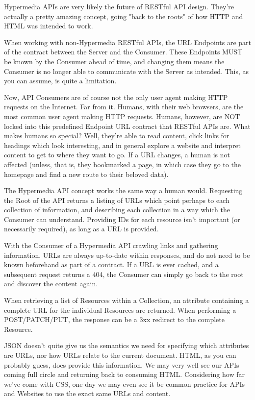 \documentclass{book}
\begin{document}
Hypermedia APIs are very likely the future of RESTful API design. They're actually a pretty amazing concept, going "back to the roots" of how HTTP and HTML was intended to work.

When working with non-Hypermedia RESTful APIs, the URL Endpoints are part of the contract between the Server and the Consumer. These Endpoints MUST be known by the Consumer ahead of time, and changing them means the Consumer is no longer able to communicate with the Server as intended. This, as you can assume, is quite a limitation.

Now, API Consumers are of course not the only user agent making HTTP requests on the Internet. Far from it. Humans, with their web browsers, are the most common user agent making HTTP requests. Humans, however, are NOT locked into this predefined Endpoint URL contract that RESTful APIs are. What makes humans so special? Well, they're able to read content, click links for headings which look interesting, and in general explore a website and interpret content to get to where they want to go. If a URL changes, a human is not affected (unless, that is, they bookmarked a page, in which case they go to the homepage and find a new route to their beloved data).

The Hypermedia API concept works the same way a human would. Requesting the Root of the API returns a listing of URLs which point perhaps to each collection of information, and describing each collection in a way which the Consumer can understand. Providing IDs for each resource isn't important (or necessarily required), as long as a URL is provided.

With the Consumer of a Hypermedia API crawling links and gathering information, URLs are always up-to-date within responses, and do not need to be known beforehand as part of a contract. If a URL is ever cached, and a subsequent request returns a 404, the Consumer can simply go back to the root and discover the content again.

When retrieving a list of Resources within a Collection, an attribute containing a complete URL for the individual Resources are returned. When performing a POST/PATCH/PUT, the response can be a 3xx redirect to the complete Resource.

JSON doesn't quite give us the semantics we need for specifying which attributes are URLs, nor how URLs relate to the current document. HTML, as you can probably guess, does provide this information. We may very well see our APIs coming full circle and returning back to consuming HTML. Considering how far we've come with CSS, one day we may even see  it be common practice for APIs and Websites to use the exact same URLs and content.
\end{document}

